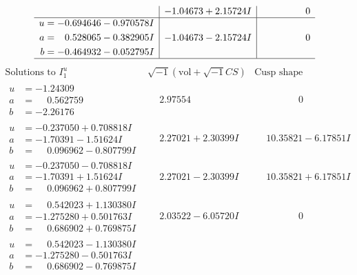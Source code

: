 \documentclass[1p]{elsarticle_modified}
\theoremstyle{definition}
\newcommand{\I}{\sqrt{-1}}
\begin{document}
$$\begin{array}{c|c|c}
 & -1.04673 + 2.15724 I & \phantom{-0.000000 } 0 \\ \hline\begin{aligned}
u &= -0.694646 - 0.970578 I \\
a &= \phantom{-}0.528065 - 0.382905 I \\
b &= -0.464932 - 0.052795 I\end{aligned}
 & -1.04673 - 2.15724 I & \phantom{-0.000000 } 0\\
 \hline 
 \end{array}$$\newpage$$\begin{array}{c|c|c}  
\text{Solutions to }I^u_{1}& \I (\text{vol} + \sqrt{-1}CS) & \text{Cusp shape}\\
 \hline 
\begin{aligned}
u &= -1.24309\phantom{ +0.000000I} \\
a &= \phantom{-}0.562759\phantom{ +0.000000I} \\
b &= -2.26176\phantom{ +0.000000I}\end{aligned}
 & \phantom{-}2.97554\phantom{ +0.000000I} & \phantom{-0.000000 } 0 \\ \hline\begin{aligned}
u &= -0.237050 + 0.708818 I \\
a &= -1.70391 - 1.51624 I \\
b &= \phantom{-}0.096962 - 0.807799 I\end{aligned}
 & \phantom{-}2.27021 + 2.30399 I & \phantom{-}10.35821 - 6.17851 I \\ \hline\begin{aligned}
u &= -0.237050 - 0.708818 I \\
a &= -1.70391 + 1.51624 I \\
b &= \phantom{-}0.096962 + 0.807799 I\end{aligned}
 & \phantom{-}2.27021 - 2.30399 I & \phantom{-}10.35821 + 6.17851 I \\ \hline\begin{aligned}
u &= \phantom{-}0.542023 + 1.130380 I \\
a &= -1.275280 + 0.501763 I \\
b &= \phantom{-}0.686902 + 0.769875 I\end{aligned}
 & \phantom{-}2.03522 - 6.05720 I & \phantom{-0.000000 } 0 \\ \hline\begin{aligned}
u &= \phantom{-}0.542023 - 1.130380 I \\
a &= -1.275280 - 0.501763 I \\
b &= \phantom{-}0.686902 - 0.769875 I\end{aligned}

\end{array}$$
\end{document}
